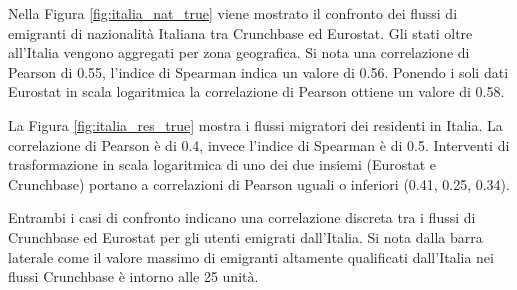 Nella Figura \ref{fig:italia_nat_true} viene mostrato il confronto dei flussi di emigranti di nazionalità Italiana tra Crunchbase ed Eurostat. Gli stati oltre all'Italia vengono aggregati per zona geografica. Si nota una correlazione di Pearson di 0.55, l'indice di Spearman indica un valore di 0.56. Ponendo i soli dati Eurostat in scala logaritmica la correlazione di Pearson ottiene un valore di 0.58.

La Figura \ref{fig:italia_res_true} mostra i flussi migratori dei residenti in Italia. La correlazione di Pearson è di 0.4, invece l'indice di Spearman è di 0.5. Interventi di trasformazione in scala logaritmica di uno dei due insiemi (Eurostat e Crunchbase) portano a correlazioni di Pearson uguali o inferiori (0.41, 0.25, 0.34).

Entrambi i casi di confronto indicano una correlazione discreta tra i flussi di Crunchbase ed Eurostat per gli utenti emigrati dall'Italia. Si nota dalla barra laterale come il valore massimo di emigranti altamente qualificati dall'Italia nei flussi Crunchbase è intorno alle 25 unità. 

